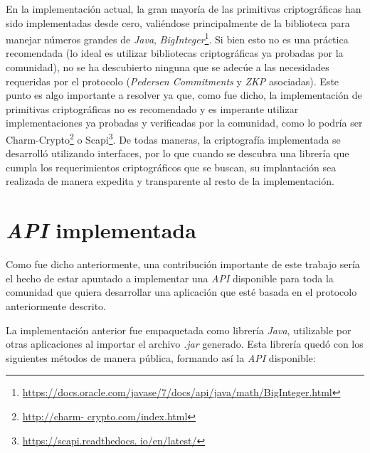En la implementación actual, la gran mayoría de las primitivas criptográficas 
han sido implementadas desde cero, valiéndose principalmente de la biblioteca 
para manejar números grandes de \emph{Java}, \emph{BigInteger}\footnote{\url{
https://docs.oracle.com/javase/7/docs/api/java/math/BigInteger.html}}. Si bien 
esto no es una práctica recomendada (lo ideal es utilizar bibliotecas 
criptográficas ya probadas por la comunidad), no se ha descubierto ninguna que 
se adecúe a las necesidades requeridas por el protocolo (\emph{Pedersen 
Commitments} y \emph{ZKP} asociadas). Este punto es algo importante a resolver 
ya que, como fue dicho, la implementación de primitivas criptográficas no es 
recomendado y es imperante utilizar implementaciones ya probadas y verificadas 
por la comunidad, como lo podría ser Charm-Crypto\footnote{\url{http://charm-
crypto.com/index.html}} o Scapi\footnote{\url{https://scapi.readthedocs.
io/en/latest/}}. De todas maneras, la criptografía implementada se desarrolló 
utilizando interfaces, por lo que cuando se descubra una librería que cumpla 
los requerimientos criptográficos que se buscan, su implantación sea realizada 
de manera expedita y transparente al resto de la implementación.

\section{\emph{API} implementada}

Como fue dicho anteriormente, una contribución importante de este trabajo 
sería el hecho de estar apuntado a implementar una \emph{API} disponible para 
toda la comunidad que quiera desarrollar una aplicación que esté basada en el 
protocolo anteriormente descrito. 

La implementación anterior fue empaquetada como librería \emph{Java}, 
utilizable por otras aplicaciones al importar el archivo \emph{.jar} generado. 
Esta librería quedó con los siguientes métodos de manera pública, formando así 
la \emph{API} disponible:

